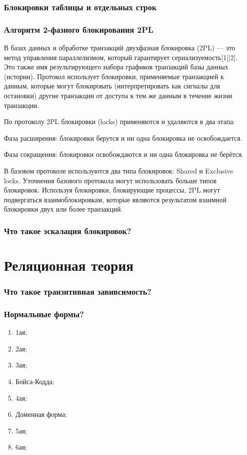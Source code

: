 \subsection{Блокировки таблицы и отдельных строк}
\subsection{Алгоритм 2-фазного блокирования 2PL}

В базах данных и обработке транзакций двухфазная блокировка (2PL) — это метод управления параллелизмом, который гарантирует сериализуемость[1][2]. Это также имя результирующего набора графиков транзакций базы данных (истории). Протокол использует блокировки, применяемые транзакцией к данным, которые могут блокировать (интерпретировать как сигналы для остановки) другие транзакции от доступа к тем же данным в течение жизни транзакции.

По протоколу 2PL блокировки (locks) применяются и удаляются в два этапа:

Фаза расширения: блокировки берутся и ни одна блокировка не освобождается.

Фаза сокращения: блокировки освобождаются и ни одна блокировка не берётся.

В базовом протоколе используются два типа блокировок: Shared и Exclusive locks. Уточнения базового протокола могут использовать больше типов блокировок. Используя блокировки, блокирующие процессы, 2PL могут подвергаться взаимоблокировкам, которые являются результатом взаимной блокировки двух или более транзакций. 

\subsection{Что такое эскалация блокировок?}

\chapter{Реляционная теория}
\subsection{Что такое транзитивная завивсимость?}
\subsection{Нормальные формы?}
\begin{enumerate}
    \item 1ая;
    \item 2ая;
    \item 3ая;
    \item Бойса-Кодда;
    \item 4ая;
    \item Доменная форма;
    \item 5ая;
    \item 6ая;
\end{enumerate}
